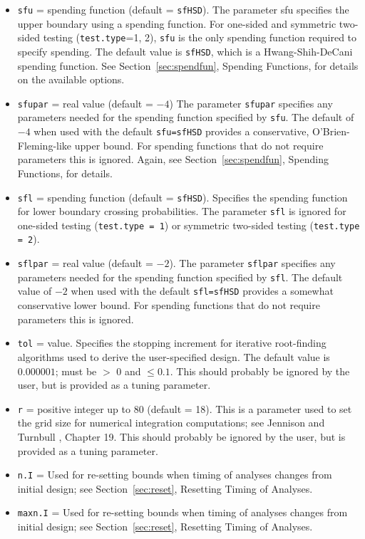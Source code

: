 \begin{itemize}
\item \texttt{sfu} = spending function (default = \texttt{sfHSD}). The
parameter sfu specifies the upper boundary using a spending function. For
one-sided and symmetric two-sided testing (\texttt{test.type}=1, 2),
\texttt{sfu} is the only spending function required to specify spending. The
default value is \texttt{sfHSD}, which is a Hwang-Shih-DeCani spending
function. See Section~\ref{sec:spendfun}, Spending Functions, for details on
the available options.

\item \texttt{sfupar} = real value (default = $-4$) The parameter
\texttt{sfupar} specifies any parameters needed for the spending function
specified by \texttt{sfu}. The default of $-4$ when used with the default
\texttt{sfu=sfHSD} provides a conservative, O'Brien-Fleming-like upper bound.
For spending functions that do not require parameters this is ignored.
Again, see Section~\ref{sec:spendfun}, Spending Functions, for details.

\item \texttt{sfl} = spending function (default = \texttt{sfHSD}). Specifies
the spending function for lower boundary crossing probabilities. The parameter
\texttt{sfl} is ignored for one-sided testing (\texttt{test.type = 1}) or
symmetric two-sided testing (\texttt{test.type = 2}).

\item \texttt{sflpar} = real value (default = $-2$). The parameter
\texttt{sflpar} specifies any parameters needed for the spending function
specified by \texttt{sfl}. The default value of $-2$ when used with the default
\texttt{sfl=sfHSD} provides a somewhat conservative lower bound. For spending
functions that do not require parameters this is ignored.

\item \texttt{tol} = value. Specifies the stopping increment for iterative
root-finding algorithms used to derive the user-specified design. The default
value is $0.000001$; must be
$>$%
0 and $\leq 0.1$. This should probably be ignored by the user, but is provided
as a tuning parameter.

\item \texttt{r} = positive integer up to 80 (default = 18). This is a
parameter used to set the grid size for numerical integration computations;
see Jennison and Turnbull \cite{JTBook}, Chapter 19. This should probably be
ignored by the user, but is provided as a tuning parameter.

\item \texttt{n.I} = 
Used for re-setting bounds when timing of analyses changes
from initial design; see Section~\ref{sec:reset}, Resetting Timing of Analyses.

\item \texttt{maxn.I} = 
Used for re-setting bounds when timing of analyses
changes from initial design; see Section~\ref{sec:reset}, Resetting Timing of Analyses.
\end{itemize}

